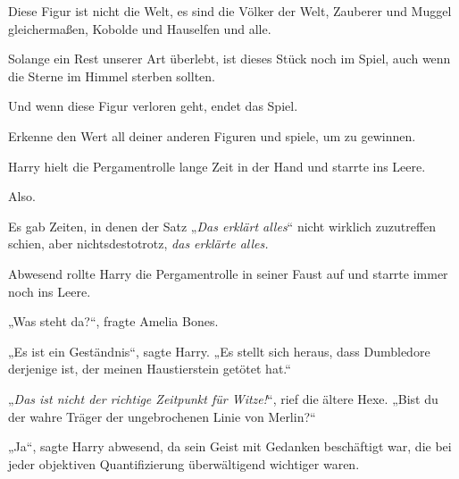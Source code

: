 \begin{writtenNote}
Diese Figur ist nicht die Welt, es sind die Völker der Welt, Zauberer und Muggel gleichermaßen, Kobolde und Hauselfen und alle.

Solange ein Rest unserer Art überlebt, ist dieses Stück noch im Spiel, auch wenn die Sterne im Himmel sterben sollten.

Und wenn diese Figur verloren geht, endet das Spiel.

Erkenne den Wert all deiner anderen Figuren und spiele, um zu gewinnen.

\end{writtenNote}

\later

Harry hielt die Pergamentrolle lange Zeit in der Hand und starrte ins Leere.

Also.

Es gab Zeiten, in denen der Satz „\emph{Das erklärt alles}“ nicht wirklich zuzutreffen schien, aber nichtsdestotrotz, \emph{das erklärte alles.}

Abwesend rollte Harry die Pergamentrolle in seiner Faust auf und starrte immer noch ins Leere.

„Was steht da?“, fragte Amelia Bones.

„Es ist ein Geständnis“, sagte Harry. „Es stellt sich heraus, dass Dumbledore derjenige ist, der meinen Haustierstein getötet hat.“

„\emph{Das ist nicht der richtige Zeitpunkt für Witze!}“, rief die ältere Hexe. „Bist du der wahre Träger der ungebrochenen Linie von Merlin?“

„Ja“, sagte Harry abwesend, da sein Geist mit Gedanken beschäftigt war, die bei jeder objektiven Quantifizierung überwältigend wichtiger waren.

